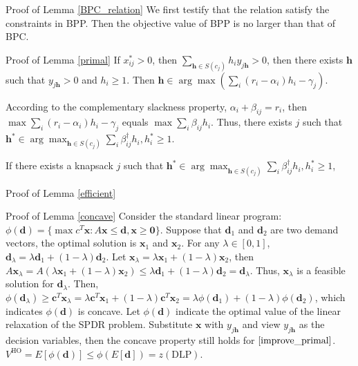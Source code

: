 \begin{pf}{Proof of Lemma \ref{BPC_relation}}
We first testify that the relation satisfy the constraints in BPP. Then the objective value of BPP is no larger than that of BPC.

\end{pf}

\begin{pf}{Proof of Lemma \ref{primal}}
  If $x_{ij}^{*}>0$, then $\sum_{\bm{h} \in S(c_{j})} h_i y_{j \bm{h}} >0$, then there exists $\bm{h}$ such that $y_{j \bm{h}} >0$ and $h_{i} \geq 1$. Then $\bm{h} \in \arg \max(\sum_{i} (r_{i} - \alpha_{i}) h_{i} - \gamma_{j})$.

  According to the complementary slackness property, $\alpha_{i} + \beta_{ij} = r_{i}$, then $\max \sum_{i} (r_{i} - \alpha_{i}) h_{i} - \gamma_{j}$ equals $\max \sum_{i} \beta_{ij} h_{i}$. Thus, there exists $j$ such that $\bm{h}^{*} \in \arg\max_{\bm{h} \in S(c_j)} \sum_{i} \beta_{ij}^{\dag} h_{i}, h_{i}^{*} \geq 1$.

  If there exists a knapsack $j$ such that $\bm{h}^{*} \in \arg\max_{\bm{h} \in S(c_j)} \sum_{i} \beta_{ij}^{\dag} h_{i}, h_{i}^{*} \geq 1$, 
\end{pf}

\begin{pf}{Proof of Lemma \ref{efficient}}
    
\end{pf}

\begin{pf}{Proof of Lemma \ref{concave}}
  Consider the standard linear program: $\phi(\bm{d})= \{\max c^{T} \bm{x}: A \bm{x} \leq \bm{d}, \bm{x} \geq \bm{0}\}$.  Suppose that $\bm{d}_1$ and $\bm{d}_2$ are two demand vectors, the optimal solution is $\bm{x}_1$ and $\bm{x}_2$. For any $\lambda \in [0, 1]$, $\bm{d}_{\lambda} = \lambda \bm{d}_{1} + (1- \lambda) \bm{d}_{2}$. Let $\bm{x}_{\lambda} = \lambda \bm{x}_{1} + (1-\lambda) \bm{x}_{2}$, then $A \bm{x}_{\lambda} = A(\lambda \bm{x}_{1} + (1-\lambda) \bm{x}_{2}) \leq \lambda \bm{d}_{1} + (1- \lambda) \bm{d}_{2} = \bm{d}_{\lambda}$. Thus, $\bm{x}_{\lambda}$ is a feasible solution for $\bm{d}_{\lambda}$. Then, $\phi(\bm{d}_{\lambda}) \geq \bm{c}^{T} \bm{x}_{\lambda} = \lambda \bm{c}^{T} \bm{x}_{1} + (1-\lambda) \bm{c}^{T} \bm{x}_{2} = \lambda \phi(\bm{d}_{1}) + (1- \lambda) \phi(\bm{d}_{2})$, which indicates $\phi(\bm{d})$ is concave. Let $\phi(\bm{d})$ indicate the optimal value of the linear relaxation of the SPDR problem. Substitute $\bm{x}$ with $y_{j \bm{h}}$ and view $y_{j \bm{h}}$ as the decision variables, then the concave property still holds for $\eqref{improve_primal}$. $V^{\text{HO}} = E[\phi(\bm{d})] \leq \phi(E[\bm{d}]) = z(\text{DLP})$.
\end{pf}

\newpage